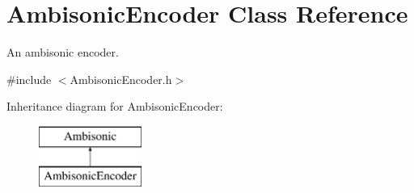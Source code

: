 \hypertarget{class_ambisonic_encoder}{\section{Ambisonic\-Encoder Class Reference}
\label{class_ambisonic_encoder}
}


An ambisonic encoder.  




{\ttfamily \#include $<$Ambisonic\-Encoder.\-h$>$}

Inheritance diagram for Ambisonic\-Encoder\-:\begin{figure}[H]
\begin{center}
\leavevmode
\includegraphics[height=2.000000cm]{class_ambisonic_encoder}
\end{center}
\end{figure}
